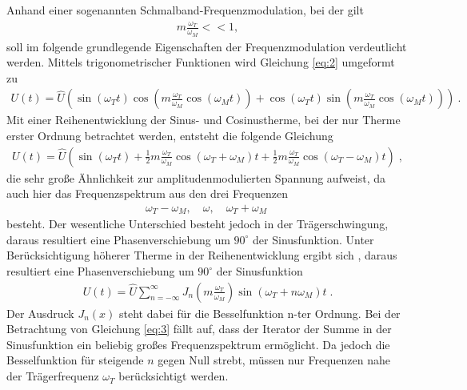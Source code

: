 Anhand einer sogenannten Schmalband-Frequenzmodulation, bei der gilt 
\begin{align}
	m\frac{\omega_T}{\omega_M}<<1,
\end{align}
soll im folgende grundlegende Eigenschaften der Frequenzmodulation verdeutlicht werden. Mittels trigonometrischer Funktionen wird Gleichung \eqref{eq:2} umgeformt zu
\begin{align}
	U(t)=\hat{U}\left(\sin{(\omega_Tt)}\cos{\left(m\frac{\omega_T}{\omega_M}\cos{(\omega_Mt)}\right)} + \cos{(\omega_Tt)}\sin{\left(m\frac{\omega_T}{\omega_M}\cos{(\omega_Mt)}\right)}\right) \:.
\end{align}
Mit einer Reihenentwicklung der Sinus- und Cosinustherme, bei der nur Therme erster Ordnung betrachtet werden, entsteht die folgende Gleichung
\begin{align}
	U(t)=\hat{U}\left(\sin{(\omega_Tt)+\frac{1}{2}m\frac{\omega_T}{\omega_M}\cos{(\omega_T+\omega_M)t}}+\frac{1}{2}m\frac{\omega_T}{\omega_M}\cos{(\omega_T-\omega_M)t}\right)\;,
\end{align}
die sehr große Ähnlichkeit zur amplitudenmodulierten Spannung aufweist, da auch hier das Frequenzspektrum aus den drei Frequenzen
\begin{align}
	\omega_T-\omega_M,\quad\omega,\quad\omega_T+\omega_M\;
\end{align}
besteht. Der wesentliche Unterschied besteht jedoch in der Trägerschwingung, daraus resultiert eine Phasenverschiebung um $90^{\circ}$ der Sinusfunktion.
Unter Berücksichtigung höherer Therme in der Reihenentwicklung ergibt sich 
, daraus resultiert eine Phasenverschiebung um $90^{\circ}$ der Sinusfunktion
\begin{align}
	U(t)=\hat{U}\sum_{n=-\infty}^{\infty} J_n\left(m\frac{\omega_T}{\omega_M}\right)\sin{(\omega_T+n\omega_M)}t\;. 
	\label{eq:3}
\end{align}
Der Ausdruck $J_n(x)$ steht dabei für die Besselfunktion n-ter Ordnung. Bei der Betrachtung von Gleichung \eqref{eq:3} fällt auf, dass der Iterator der Summe in der Sinusfunktion ein beliebig großes Frequenzspektrum ermöglicht. Da jedoch die Besselfunktion für steigende $n$ gegen Null strebt, müssen nur Frequenzen nahe der Trägerfrequenz $\omega_T$ berücksichtigt werden.


